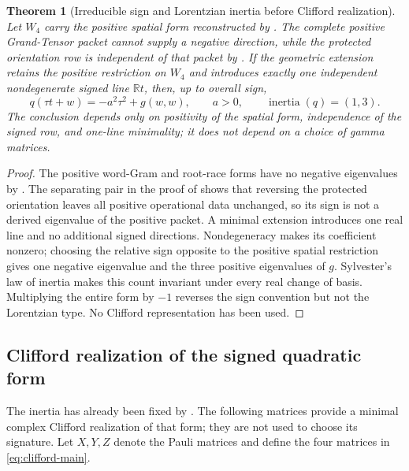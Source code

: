 \documentclass[11pt]{article}
\newtheorem{theorem}{Theorem}[section]
\theoremstyle{definition}
\theoremstyle{remark}
\newcommand{\R}{\mathbb R}
\begin{document}
\begin{theorem}[Irreducible sign and Lorentzian inertia before Clifford realization]
\label{thm:supp-signature-minimality}
Let $W_4$ carry the positive spatial form reconstructed by
.  The complete positive Grand-Tensor packet cannot
supply a negative direction, while the protected orientation row is independent
of that packet by .  If the geometric
extension retains the positive restriction on $W_4$ and introduces exactly one
independent nondegenerate signed line $\R t$, then, up to overall sign,
\begin{equation}
 \boxed{q(\tau t+w)=-a^2\tau^2+g(w,w),\qquad a>0,
 \qquad \operatorname{inertia}(q)=(1,3).}
 \label{eq:supp-signature-inertia}
\end{equation}
The conclusion depends only on positivity of the spatial form, independence of
the signed row, and one-line minimality; it does not depend on a choice of gamma
matrices.
\end{theorem}
\begin{proof}
The positive word-Gram and root-race forms have no negative eigenvalues by
.  The separating pair in the proof of
 shows that reversing the protected
orientation leaves all positive operational data unchanged, so its sign is not
a derived eigenvalue of the positive packet.  A minimal extension introduces
one real line and no additional signed directions.  Nondegeneracy makes its
coefficient nonzero; choosing the relative sign opposite to the positive
spatial restriction gives one negative eigenvalue and the three positive
eigenvalues of $g$.  Sylvester's law of inertia makes this count invariant
under every real change of basis.  Multiplying the entire form by $-1$ reverses
the sign convention but not the Lorentzian type.  No Clifford representation
has been used.
\end{proof}

\subsection{Clifford realization of the signed quadratic form}

The inertia has already been fixed by
.  The following matrices provide a
minimal complex Clifford realization of that form; they are not used to choose
its signature.  Let $X,Y,Z$ denote the Pauli matrices and define the four
matrices in \eqref{eq:clifford-main}.
\end{document}

